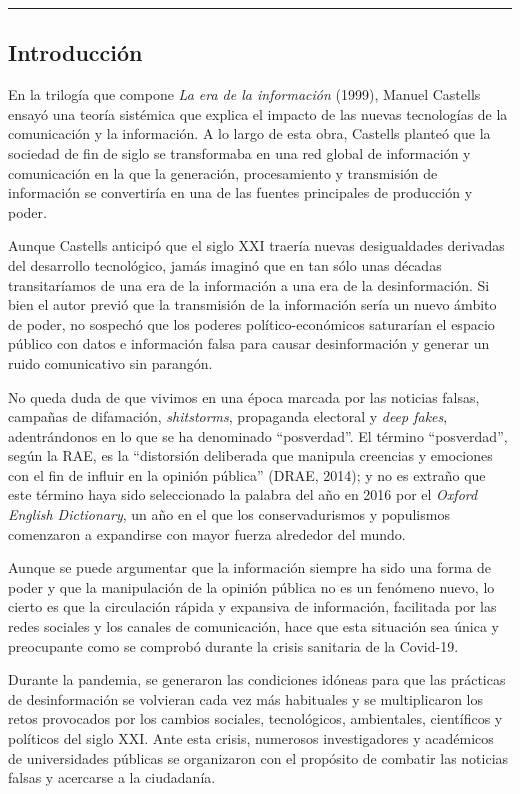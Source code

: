 \documentclass[
]{interact}
\begin{document}
\begin{center}\rule{0.5\linewidth}{0.5pt}\end{center}

\subsection{Introducción}\label{introducciuxf3n}

En la trilogía que compone \emph{La era de la información} (1999),
Manuel Castells ensayó una teoría sistémica que explica el impacto de
las nuevas tecnologías de la comunicación y la información. A lo largo
de esta obra, Castells planteó que la sociedad de fin de siglo se
transformaba en una red global de información y comunicación en la que
la generación, procesamiento y transmisión de información se convertiría
en una de las fuentes principales de producción y poder.

Aunque Castells anticipó que el siglo XXI traería nuevas desigualdades
derivadas del desarrollo tecnológico, jamás imaginó que en tan sólo unas
décadas transitaríamos de una era de la información a una era de la
desinformación. Si bien el autor previó que la transmisión de la
información sería un nuevo ámbito de poder, no sospechó que los poderes
político-económicos saturarían el espacio público con datos e
información falsa para causar desinformación y generar un ruido
comunicativo sin parangón.

No queda duda de que vivimos en una época marcada por las noticias
falsas, campañas de difamación, \emph{shitstorms}, propaganda electoral
y \emph{deep fakes}, adentrándonos en lo que se ha denominado
``posverdad''. El término ``posverdad'', según la RAE, es la
``distorsión deliberada que manipula creencias y emociones con el fin de
influir en la opinión pública'' (DRAE, 2014); y no es extraño que este
término haya sido seleccionado la palabra del año en 2016 por el
\emph{Oxford English Dictionary}, un año en el que los conservadurismos
y populismos comenzaron a expandirse con mayor fuerza alrededor del
mundo.

Aunque se puede argumentar que la información siempre ha sido una forma
de poder y que la manipulación de la opinión pública no es un fenómeno
nuevo, lo cierto es que la circulación rápida y expansiva de
información, facilitada por las redes sociales y los canales de
comunicación, hace que esta situación sea única y preocupante como se
comprobó durante la crisis sanitaria de la Covid-19.

Durante la pandemia, se generaron las condiciones idóneas para que las
prácticas de desinformación se volvieran cada vez más habituales y se
multiplicaron los retos provocados por los cambios sociales,
tecnológicos, ambientales, científicos y políticos del siglo XXI. Ante
esta crisis, numerosos investigadores y académicos de universidades
públicas se organizaron con el propósito de combatir las noticias falsas
y acercarse a la ciudadanía.
\end{document}
